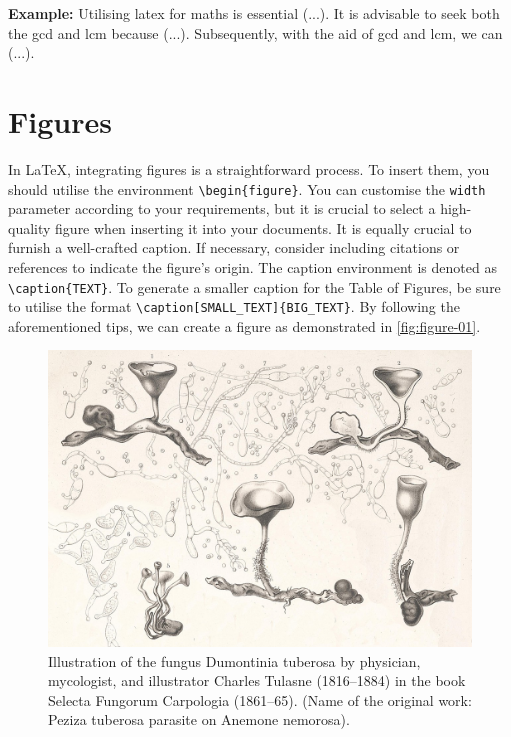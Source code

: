 {\vspace{.875em}
\textbf{Example:} Utilising \Gls{latex} for \Gls{maths} is essential (...). It is advisable to seek both the \acrfull{gcd} and \acrfull{lcm} because (...). Subsequently, with the aid of \acrshort{gcd} and \acrshort{lcm}, we can (...).

\section{Figures}
In \LaTeX, integrating figures is a straightforward process. To insert them, you should utilise the environment \verb|\begin{figure}|. You can customise the \verb|width| parameter according to your requirements, but it is crucial to select a high-quality figure when inserting it into your documents. It is equally crucial to furnish a well-crafted caption. If necessary, consider including citations or references to indicate the figure's origin. The caption environment is denoted as \verb|\caption{TEXT}|. To generate a smaller caption for the Table of Figures, be sure to utilise the format \verb|\caption[SMALL_TEXT]{BIG_TEXT}|. By following the aforementioned tips, we can create a figure as demonstrated in \autoref{fig:figure-01}.

\begin{figure}[!htpb]
    \centering
    \includegraphics[width=\linewidth]{Figures/PezizaTuberosa.jpg}
    \caption[Illustration of the fungus Dumontinia tuberosa.]{Illustration of the fungus Dumontinia tuberosa by physician, mycologist, and illustrator Charles Tulasne (1816–1884) in the book Selecta Fungorum Carpologia (1861–65). (Name of the original work: Peziza tuberosa parasite on Anemone nemorosa).}
    \label{fig:figure-01}
\end{figure}

}

